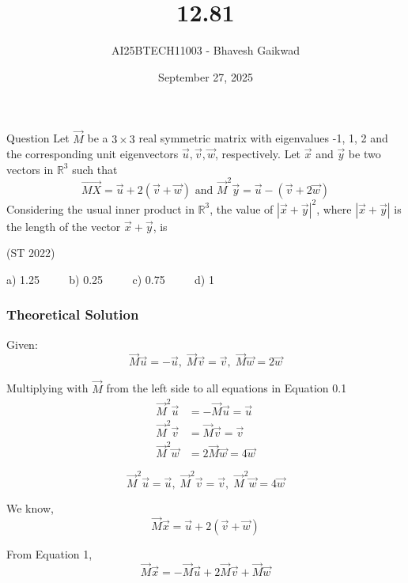 \documentclass{beamer}
\title
{12.81}
\date{September 27, 2025}
\author 
{AI25BTECH11003 - Bhavesh Gaikwad}
\begin{document}
\frame{\titlepage}
\begin{frame}{Question}
Let $\vec{M}$ be a $3\times3$ real symmetric matrix with eigenvalues -1, 1, 2 and the corresponding unit eigenvectors $\vec{u}, \vec{v},\vec{w}$, respectively. Let $\vec{x}$ and $\vec{y}$ be two vectors in $\mathbb{R}^3$ such that
$$\vec{MX} = \vec{u} + 2(\vec{v} + \vec{w}) \text{ and } \vec{M}^2\vec{y} = \vec{u} - (\vec{v} + 2\vec{w})$$
Considering the usual inner product in $\mathbb{R}^3$, the value of $|\vec{x} + \vec{y}|^2$, where $|\vec{x} + \vec{y}|$ is the
length of the vector $\vec{x} + \vec{y}$, is

\hfill{(ST 2022)}

a) 1.25 $\qquad$ b) 0.25 $\qquad$ c) 0.75 $\qquad$ d) 1
\end{frame}


\begin{frame}[fragile]
    \frametitle{Theoretical Solution}
Given:
\begin{equation}
\vec{M}\vec{u} = - \vec{u}, \; \vec{M}\vec{v} = \vec{v}, \; \vec{M}\vec{w} = 2\vec{w}
\end{equation}

Multiplying with $\vec{M}$ from the left side to all equations in Equation 0.1
\begin{align}
    \vec{M}^2\vec{u} &= - \vec{M}\vec{u} = \vec{u} \\
    \vec{M}^2\vec{v} &= \vec{M}\vec{v} = \vec{v}\\
    \vec{M}^2\vec{w} &= 2\vec{M}\vec{w} = 4\vec{w}
\end{align}

\begin{equation}
\vec{M}^2\vec{u} = \vec{u}, \; \vec{M}^2\vec{v} = \vec{v}, \; \vec{M}^2\vec{w} = 4\vec{w}
\end{equation}

We know,
\begin{equation}
    \vec{M}\vec{x} = \vec{u} + 2(\vec{v} + \vec{w})
\end{equation}

From Equation 1,
\begin{equation}
    \vec{M}\vec{x} = -\vec{M}\vec{u} + 2\vec{M}\vec{v} + \vec{M}\vec{w}
\end{equation}
\end{frame}
\end{document}

